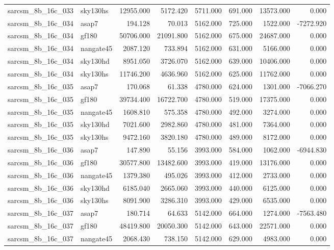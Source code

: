 \begin{tabular}{llrrrrrr}
sarcsm\_8b\_16c\_033 & sky130hs & 12955.000 & 5172.420 & 5711.000 & 691.000 & 13573.000 & 0.000 \\
sarcsm\_8b\_16c\_034 & asap7 & 194.128 & 70.013 & 5162.000 & 725.000 & 1522.000 & -7272.920 \\
sarcsm\_8b\_16c\_034 & gf180 & 50706.000 & 21091.800 & 5162.000 & 675.000 & 24687.000 & 0.000 \\
sarcsm\_8b\_16c\_034 & nangate45 & 2087.120 & 733.894 & 5162.000 & 631.000 & 5166.000 & 0.000 \\
sarcsm\_8b\_16c\_034 & sky130hd & 8951.050 & 3726.070 & 5162.000 & 639.000 & 10406.000 & 0.000 \\
sarcsm\_8b\_16c\_034 & sky130hs & 11746.200 & 4636.960 & 5162.000 & 625.000 & 11762.000 & 0.000 \\
sarcsm\_8b\_16c\_035 & asap7 & 170.068 & 61.338 & 4780.000 & 624.000 & 1301.000 & -7066.270 \\
sarcsm\_8b\_16c\_035 & gf180 & 39734.400 & 16722.700 & 4780.000 & 519.000 & 17375.000 & 0.000 \\
sarcsm\_8b\_16c\_035 & nangate45 & 1608.810 & 575.358 & 4780.000 & 492.000 & 3274.000 & 0.000 \\
sarcsm\_8b\_16c\_035 & sky130hd & 7021.600 & 2982.860 & 4780.000 & 481.000 & 7364.000 & 0.000 \\
sarcsm\_8b\_16c\_035 & sky130hs & 9472.160 & 3820.180 & 4780.000 & 489.000 & 8172.000 & 0.000 \\
sarcsm\_8b\_16c\_036 & asap7 & 147.890 & 55.156 & 3993.000 & 584.000 & 1062.000 & -6944.830 \\
sarcsm\_8b\_16c\_036 & gf180 & 30577.800 & 13482.600 & 3993.000 & 419.000 & 13176.000 & 0.000 \\
sarcsm\_8b\_16c\_036 & nangate45 & 1379.380 & 495.026 & 3993.000 & 412.000 & 2733.000 & 0.000 \\
sarcsm\_8b\_16c\_036 & sky130hd & 6185.040 & 2665.060 & 3993.000 & 440.000 & 6125.000 & 0.000 \\
sarcsm\_8b\_16c\_036 & sky130hs & 8091.900 & 3286.310 & 3993.000 & 429.000 & 6535.000 & 0.000 \\
sarcsm\_8b\_16c\_037 & asap7 & 180.714 & 64.633 & 5142.000 & 664.000 & 1274.000 & -7563.480 \\
sarcsm\_8b\_16c\_037 & gf180 & 48419.800 & 20050.300 & 5142.000 & 643.000 & 22571.000 & 0.000 \\
sarcsm\_8b\_16c\_037 & nangate45 & 2068.430 & 738.150 & 5142.000 & 629.000 & 4983.000 & 0.000 \\

\end{tabular}

